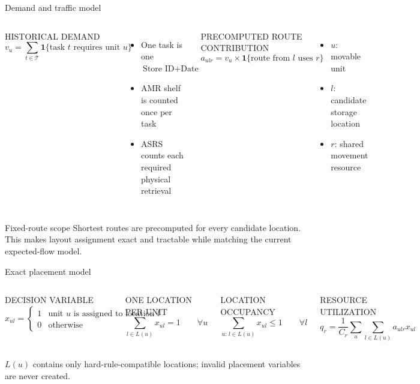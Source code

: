 \documentclass[aspectratio=169,10pt]{beamer}
\newcommand{\smallcaps}[1]{\textcolor{Slate}{\scriptsize\MakeUppercase{#1}}}
\begin{document}
\begin{frame}{Demand and traffic model}
  \begin{columns}[T,onlytextwidth]
      \smallcaps{Historical demand}
      \[
        v_u = \sum_{t \in \mathcal{T}}
        \mathbf{1}\{\text{task }t\text{ requires unit }u\}
      \]
      \begin{itemize}
        \item One task is one \(\text{Store ID}+\text{Date}\)
        \item AMR shelf is counted once per task
        \item ASRS counts each required physical retrieval
      \end{itemize}

      \smallcaps{Precomputed route contribution}
      \[
        a_{ulr} =
        v_u \times
        \mathbf{1}\{\text{route from }l\text{ uses }r\}
      \]
      \begin{itemize}
        \item \(u\): movable unit
        \item \(l\): candidate storage location
        \item \(r\): shared movement resource
      \end{itemize}
  \end{columns}

  \vspace{0.35cm}
  \begin{block}{Fixed-route scope}
    Shortest routes are precomputed for every candidate location. This makes
    layout assignment exact and tractable while matching the current expected-flow model.
  \end{block}
\end{frame}

\begin{frame}{Exact placement model}
  \begin{columns}[T,onlytextwidth]
      \smallcaps{Decision variable}
      \[
        x_{ul} =
        \begin{cases}
          1 & \text{unit \(u\) is assigned to location \(l\)}\\
          0 & \text{otherwise}
        \end{cases}
      \]

      \smallcaps{One location per unit}
      \[
        \sum_{l \in L(u)} x_{ul}=1
        \qquad \forall u
      \]

      \smallcaps{Location occupancy}
      \[
        \sum_{u:\,l\in L(u)} x_{ul}\leq 1
        \qquad \forall l
      \]

      \smallcaps{Resource utilization}
      \[
        q_r=\frac{1}{C_r}
        \sum_u \sum_{l\in L(u)} a_{ulr}x_{ul}
      \]
  \end{columns}

  \vspace{0.3cm}
  \begin{center}
    \(L(u)\) contains only hard-rule-compatible locations;
    invalid placement variables are never created.
  \end{center}
\end{frame}
\end{document}

